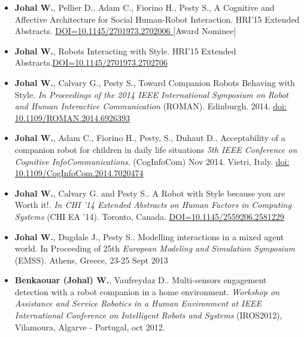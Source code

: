 \documentclass[10pt]{article}
\begin{document}
\begin{itemize}
	
\item  \textbf{Johal W.}, Pellier D., Adam C., Fiorino H., Pesty S., A Cognitive and Affective Architecture for Social Human-Robot Interaction. HRI'15 Extended Abstracts. \href{http://doi.acm.org/10.1145/2701973.2702006}{DOI=10.1145/2701973.2702006 }  [Award Nominee]	

\item  \textbf{Johal W.}, Robots Interacting with Style. HRI'15 Extended Abstracts.\href{http://doi.acm.org/10.1145/2701973.2702706}{DOI=10.1145/2701973.2702706}   

\item \textbf{Johal W.}, Calvary G., Pesty S., Toward Companion Robots Behaving with Style. \emph{In Proceedings of the 2014 IEEE International Symposium on Robot and Human Interactive Communication} (ROMAN). Edinburgh. 2014. \href{ http://ieeexplore.ieee.org/stamp/stamp.jsp?tp=&arnumber=6926393&isnumber=6926219}{doi: 10.1109/ROMAN.2014.6926393}

\item \textbf{Johal W.}, Adam C., Fiorino H., Pesty, S., Duhaut D.. Acceptability of a companion
robot for children in daily life
situations \emph{5th IEEE Conference on Cognitive InfoCommunications}. (CogInfoCom) Nov 2014. Vietri, Italy. \href{http://ieeexplore.ieee.org/stamp/stamp.jsp?tp=&arnumber=7020474&isnumber=7020399}{doi: 10.1109/CogInfoCom.2014.7020474}


\item \textbf{Johal W.}, Calvary G. and  Pesty S.. A Robot with Style because you are Worth it!.  \emph{In CHI '14 Extended Abstracts on Human Factors in Computing Systems} (CHI EA '14). Toronto, Canada. \href{http://doi.acm.org/10.1145/2559206.2581229}{DOI=10.1145/2559206.2581229}

\item \textbf{Johal W.}, Dugdale J.,  Pesty S.. Modelling interactions in a mixed agent world. In Proceeding of 25th \emph{European Modeling and Simulation Symposium} (EMSS). Athens, Greece, 23-25 Sept 2013

\item  \textbf{Benkaouar (Johal) W.}, Vaufreydaz D.. Multi-sensors engagement detection with a robot companion in a home environment. \emph{Workshop on Assistance and Service Robotics in a Human Environment at IEEE International Conference on Intelligent Robots and Systems} (IROS2012), Vilamoura, Algarve - Portugal, oct 2012.

  

\end{itemize}
\end{document}
